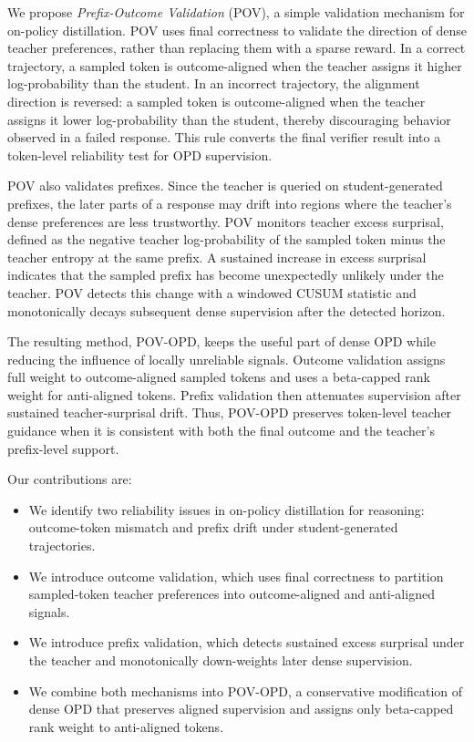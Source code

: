 We propose \emph{Prefix-Outcome Validation} (POV), a simple validation mechanism for on-policy distillation. POV uses final correctness to validate the direction of dense teacher preferences, rather than replacing them with a sparse reward. In a correct trajectory, a sampled token is outcome-aligned when the teacher assigns it higher log-probability than the student. In an incorrect trajectory, the alignment direction is reversed: a sampled token is outcome-aligned when the teacher assigns it lower log-probability than the student, thereby discouraging behavior observed in a failed response. This rule converts the final verifier result into a token-level reliability test for OPD supervision.

POV also validates prefixes. Since the teacher is queried on student-generated prefixes, the later parts of a response may drift into regions where the teacher's dense preferences are less trustworthy. POV monitors teacher excess surprisal, defined as the negative teacher log-probability of the sampled token minus the teacher entropy at the same prefix. A sustained increase in excess surprisal indicates that the sampled prefix has become unexpectedly unlikely under the teacher. POV detects this change with a windowed CUSUM statistic and monotonically decays subsequent dense supervision after the detected horizon.

The resulting method, POV-OPD, keeps the useful part of dense OPD while reducing the influence of locally unreliable signals. Outcome validation assigns full weight to outcome-aligned sampled tokens and uses a beta-capped rank weight for anti-aligned tokens. Prefix validation then attenuates supervision after sustained teacher-surprisal drift. Thus, POV-OPD preserves token-level teacher guidance when it is consistent with both the final outcome and the teacher's prefix-level support.

Our contributions are:
\begin{itemize}
    \item We identify two reliability issues in on-policy distillation for reasoning: outcome-token mismatch and prefix drift under student-generated trajectories.
    \item We introduce outcome validation, which uses final correctness to partition sampled-token teacher preferences into outcome-aligned and anti-aligned signals.
    \item We introduce prefix validation, which detects sustained excess surprisal under the teacher and monotonically down-weights later dense supervision.
    \item We combine both mechanisms into POV-OPD, a conservative modification of dense OPD that preserves aligned supervision and assigns only beta-capped rank weight to anti-aligned tokens.
\end{itemize}
